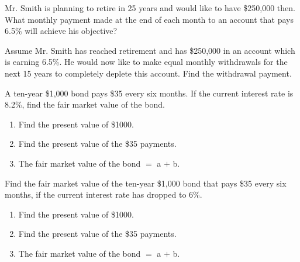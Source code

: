 \begin{puzzle}
    Mr. Smith is planning to retire in 25 years and would like to have \$250,000 then. What monthly payment made at the end of each month to an account that pays 6.5\% will achieve his objective?
\end{puzzle}

\begin{puzzle}
    Assume Mr. Smith has reached retirement and has \$250,000 in an account which is earning 6.5\%. He would now like to make equal monthly withdrawals for the next 15 years to completely deplete this account. Find the withdrawal payment.
\end{puzzle}

\begin{puzzle}
    A ten-year \$1,000 bond pays \$35 every six months. If the current interest rate is 8.2\%, find the fair market value of the bond.
    \begin{enumerate}
        \item Find the present value of \$1000.
        \item Find the present value of the \$35 payments.
        \item The fair market value of the bond \(=\) a \(+\) b.
    \end{enumerate}
\end{puzzle}

\begin{puzzle}
    Find the fair market value of the ten-year \$1,000 bond that pays \$35 every six months, if the current interest rate has dropped to 6\%.
    \begin{enumerate}
        \item Find the present value of \$1000.
        \item Find the present value of the \$35 payments.
        \item The fair market value of the bond \(=\) a \(+\) b.
    \end{enumerate}
\end{puzzle}
